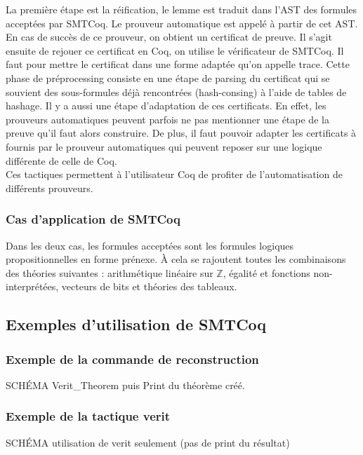 \documentclass{article}
\begin{document}
La première étape est la réification, le lemme est traduit dans l'AST des formules acceptées par SMTCoq. Le prouveur automatique est appelé à partir de cet AST. En cas de succès de ce prouveur, on obtient un certificat de preuve. 
Il s'agit ensuite de rejouer ce certificat en Coq, on utilise le vérificateur de SMTCoq. Il faut pour mettre le certificat dans une forme adaptée qu'on appelle trace. Cette phase de préprocessing consiste en une étape de parsing du certificat qui se souvient des sous-formules déjà rencontrées (hash-consing) à l'aide de tables de hashage.  Il y a aussi une étape d'adaptation de ces certificats. En effet, les prouveurs automatiques peuvent parfois ne pas mentionner une étape de la preuve qu'il faut alors construire. De plus, il faut pouvoir adapter les certificats à fournis par le prouveur automatiques qui peuvent reposer sur une logique différente de celle de Coq. \\

Ces tactiques permettent à l'utilisateur Coq de profiter de l'automatisation de différents prouveurs.

\subsubsection{Cas d'application de SMTCoq}

Dans les deux cas, les formules acceptées sont les formules logiques propositionnelles en forme prénexe. À cela se rajoutent toutes les combinaisons des théories suivantes : arithmétique linéaire sur $\mathbb{Z}$, égalité et fonctions non-interprétées, vecteurs de bits et théories des tableaux. 

\subsection{Exemples d'utilisation de SMTCoq}

\subsubsection{Exemple de la commande de reconstruction}

SCHÉMA Verit\_Theorem puis Print du théorème créé.

\subsubsection{Exemple de la tactique verit}

SCHÉMA utilisation de verit seulement (pas de print du résultat)
\end{document}
